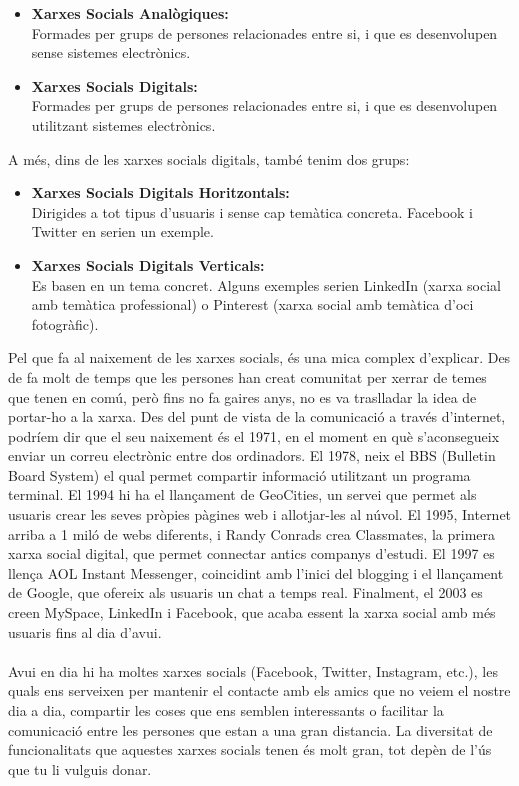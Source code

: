 \documentclass[11pt,catalan,listoffigures,listoftables]{tfgetsinf}
\begin{document}
\begin{itemize}
	\item \textbf{Xarxes Socials Analògiques:} \\Formades per grups de persones relacionades entre si, i que es desenvolupen sense sistemes electrònics.
	\item \textbf{Xarxes Socials Digitals:} \\Formades per grups de persones relacionades entre si, i que es desenvolupen utilitzant sistemes electrònics.
\end{itemize}  
A més, dins de les xarxes socials digitals, també tenim dos grups:
\begin{itemize}
	\item \textbf{Xarxes Socials Digitals Horitzontals:} \\Dirigides a tot tipus d’usuaris i sense cap temàtica concreta. Facebook i Twitter en serien un exemple.
	\item \textbf{Xarxes Socials Digitals Verticals: } \\Es basen en un tema concret. Alguns exemples serien LinkedIn (xarxa social amb temàtica professional) o Pinterest (xarxa social amb temàtica d’oci fotogràfic).
\end{itemize}  
Pel que fa al naixement de les xarxes socials, és una mica complex d’explicar. Des de fa molt de temps que les persones han creat comunitat per xerrar de temes que tenen en comú, però fins no fa gaires anys, no es va traslladar la idea de portar-ho a la xarxa. Des del punt de vista de la comunicació a través d’internet, podríem dir que el seu naixement és el 1971, en el moment en què s’aconsegueix enviar un correu electrònic entre dos ordinadors. El 1978, neix el BBS (Bulletin Board System) el qual permet compartir informació utilitzant un programa terminal. El 1994 hi ha el llançament de GeoCities, un servei que permet als usuaris crear les seves pròpies pàgines web i allotjar-les al núvol. El 1995, Internet arriba a 1 miló de webs diferents, i Randy Conrads crea Classmates, la primera xarxa social digital, que permet connectar antics companys d’estudi. El 1997 es llença AOL Instant Messenger, coincidint amb l’inici del blogging i el llançament de Google, que ofereix als usuaris un chat a temps real. Finalment, el 2003 es creen MySpace, LinkedIn i Facebook, que acaba essent la xarxa social amb més usuaris fins al dia d’avui. \\ \\Avui en dia hi ha moltes xarxes socials (Facebook, Twitter, Instagram, etc.), les quals ens serveixen per mantenir el contacte amb els amics que no veiem el nostre dia a dia, compartir les coses que ens semblen interessants o facilitar la comunicació entre les persones que estan a una gran distancia. La diversitat de funcionalitats que aquestes xarxes socials tenen és molt gran, tot depèn de l’ús que tu li vulguis donar.
\end{document}
